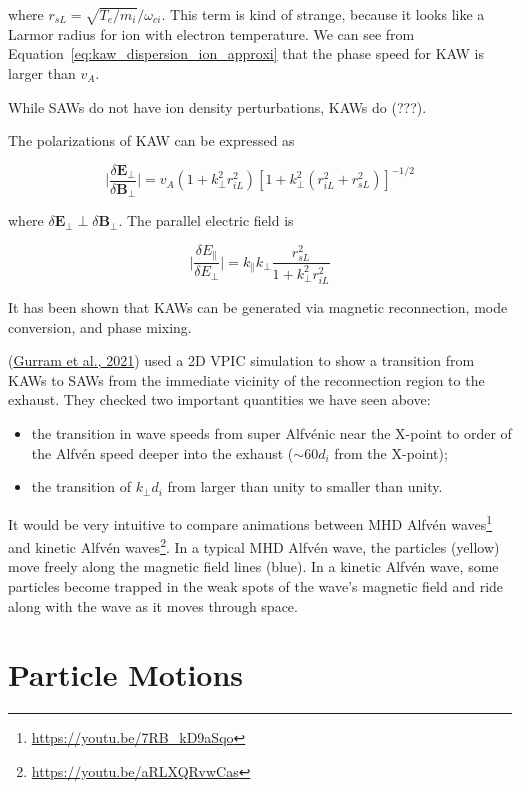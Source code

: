 \documentclass[
  notoc %
]{tufte-book}
\DeclareRobustCommand{\href}[2]{#2\footnote{\url{#1}}}
\providecommand{\tightlist}{%
  \setlength{\itemsep}{0pt}\setlength{\parskip}{0pt}
}
\begin{document}
where \(r_{sL}=\sqrt{T_e/m_i}/\omega_{ci}\). This term is kind of
strange, because it looks like a Larmor radius for ion with electron
temperature. We can see from
Equation~\ref{eq:kaw_dispersion_ion_approxi} that the phase speed for
KAW is larger than \(v_A\).

While SAWs do not have ion density perturbations, KAWs do (???).

The polarizations of KAW can be expressed as

\[
\bigg\lvert \frac{\delta \mathbf{E}_\perp}{\delta \mathbf{B}_\perp} \bigg\rvert = v_A(1+k_\perp^2r_{iL}^2)[1+k_\perp^2(r_{iL}^2+r_{sL}^2)]^{-1/2}
\]

where \(\delta\mathbf{E}_\perp \perp \delta\mathbf{B}_\perp\). The
parallel electric field is

\[
\bigg\lvert \frac{\delta E_\parallel}{\delta E_\perp} \bigg\rvert = k_\parallel k_\perp\frac{r_{sL}^2}{1+k_\perp^2r_{iL}^2}
\]

It has been shown that KAWs can be generated via magnetic reconnection,
mode conversion, and phase mixing.

(\protect\hyperlink{ref-gurram2021shear}{Gurram et al., 2021}) used a 2D
VPIC simulation to show a transition from KAWs to SAWs from the
immediate vicinity of the reconnection region to the exhaust. They
checked two important quantities we have seen above:

\begin{itemize}
\tightlist
\item
  the transition in wave speeds from super Alfvénic near the X-point to
  order of the Alfvén speed deeper into the exhaust (\(\sim 60 d_i\)
  from the X-point);
\item
  the transition of \(k_\perp d_i\) from larger than unity to smaller
  than unity.
\end{itemize}

It would be very intuitive to compare animations between
\href{https://youtu.be/7RB_kD9aSqo}{MHD Alfvén waves} and
\href{https://youtu.be/aRLXQRvwCas}{kinetic Alfvén waves}. In a typical
MHD Alfvén wave, the particles (yellow) move freely along the magnetic
field lines (blue). In a kinetic Alfvén wave, some particles become
trapped in the weak spots of the wave's magnetic field and ride along
with the wave as it moves through space.

\hypertarget{particle-motions}{%
\section{Particle Motions}\label{particle-motions}}
\end{document}
